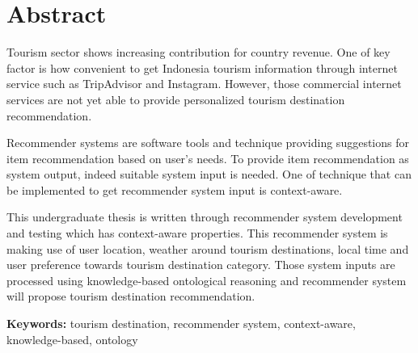 \chapter*{Abstract}

\par
Tourism sector shows increasing contribution for country revenue. One of key factor is how convenient to get Indonesia tourism information through internet service such as TripAdvisor
and Instagram. However, those commercial internet services are not yet able to provide personalized tourism destination
recommendation.
\par
Recommender systems are software tools and technique providing suggestions for item recommendation
based on user's needs. To provide item recommendation as system output, indeed suitable system input is needed. One of technique that can be implemented
to get recommender system input is context-aware.
\par
This undergraduate thesis is written through recommender system development and testing which has context-aware properties. This recommender
system is making use of user location, weather around tourism destinations, local time and user preference towards 
tourism destination category. Those system inputs are processed using knowledge-based ontological reasoning and recommender system
will propose tourism destination recommendation.

\vspace{0.5 cm}
\begin{flushleft}
{\textbf{Keywords:} tourism destination, recommender system, context-aware, knowledge-based, ontology}
\end{flushleft}